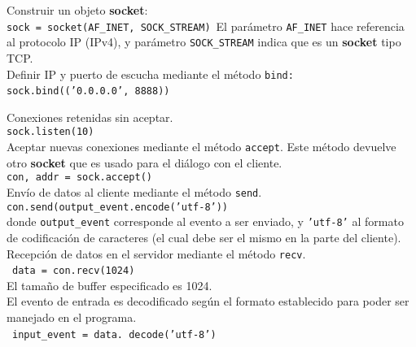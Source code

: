 Construir un objeto \textbf{socket}:\\
\texttt{sock = socket(AF\_INET, SOCK\_STREAM)}\
El parámetro \texttt{AF\_INET} hace referencia al protocolo IP (IPv4), y parámetro \texttt{SOCK\_STREAM} indica que es un \textbf{socket} tipo TCP.\\

Definir IP y puerto de escucha mediante el método \texttt{bind:}\\
\texttt{sock.bind(('0.0.0.0', 8888))}\

Conexiones retenidas sin aceptar.\\
\texttt{sock.listen(10)}\\
Aceptar nuevas conexiones mediante el método \texttt{accept}. Este método devuelve otro \textbf{socket} que es usado para el diálogo con el cliente.\\
\medskip
\texttt{con, addr = sock.accept()}\\
Envío de datos al cliente mediante el método \texttt{send}.\\
\medskip
\texttt{con.send(output\_event.encode('utf-8'))}\\
donde \texttt{output\_event} corresponde al evento a ser enviado, y \texttt{'utf-8'} al formato de codificación de caracteres (el cual debe ser el mismo en la parte del cliente).\\
Recepción de datos en el servidor mediante el método \texttt{recv}.\\
\medskip\
\texttt{data = con.recv(1024)}\\
El tamaño de buffer especificado es 1024.\\
El evento de entrada es decodificado según el formato establecido para poder ser manejado en el programa.\\
\medskip\
\texttt{input\_event = data. decode('utf-8')}\\

